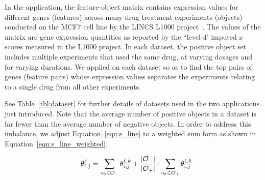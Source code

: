 In the \lincs application, the feature-object matrix contains expression values for different genes (features) across many drug treatment experiments (objects) conducted on the MCF7 cell line by the LINCS L1000 project~\cite{subramanian2017next}. The values of the matrix are gene expression quantities as reported by the ``level-4' imputed z-scores measured in the L1000 project. In each dataset, the positive object set includes multiple experiments that used the same drug, at varying dosages and for varying durations. We applied \genviz on each dataset so as to find the top pairs of genes (feature pairs) whose expression values separates the \lincs experiments relating to a single drug from all other \lincs experiments.

See Table~\ref{tbl:dataset} for further details of datasets used in the two applications just introduced. Note that the average number of positive objects in a dataset is far fewer than the average number of negative objects. In order to address this imbalance, we adjust Equation~\ref{eqn:s_line} to a weighted sum form as shown in Equation~\ref{eqn:s_line_weighted}.

 


\begin{equation}\label{eqn:s_line_weighted}
\hspace{3mm} \theta_{i,j}^{\ell}= \sum_{o_k\in{\oo_-}}{\theta_{i,j}^{\ell,k}}+\frac{|\oo_-|}{|\oo_+|}\cdot\sum_{o_k\in{\oo_+}}{\theta_{i,j}^{\ell,k}} %
\end{equation}

